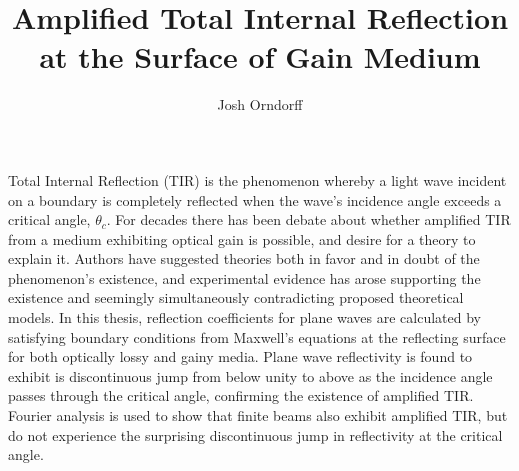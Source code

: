 \documentclass[12pt]{uthesis-v12}
\begin{document}

\title{Amplified Total Internal Reflection at the Surface of Gain Medium}

\author{Josh Orndorff}



\maketitle


\begin{abstractpage}
Total Internal Reflection (TIR) is the phenomenon whereby a light wave incident on a boundary is completely reflected when the wave's incidence angle exceeds a critical angle, $\theta_c$. For decades there has been debate about whether amplified TIR from a medium exhibiting optical gain is possible, and desire for a theory to explain it. Authors have suggested theories both in favor and in doubt of the phenomenon's existence, and experimental evidence has arose supporting the existence and seemingly simultaneously contradicting proposed theoretical models. In this thesis, reflection coefficients for plane waves are calculated by satisfying boundary conditions from Maxwell's equations at the reflecting surface for both optically lossy and gainy media. Plane wave reflectivity is found to exhibit is discontinuous jump from below unity to above as the incidence angle passes through the critical angle, confirming the existence of amplified TIR. Fourier analysis is used to show that finite beams also exhibit amplified TIR, but do not experience the surprising discontinuous jump in reflectivity at the critical angle.
\end{abstractpage}


\end{document}
